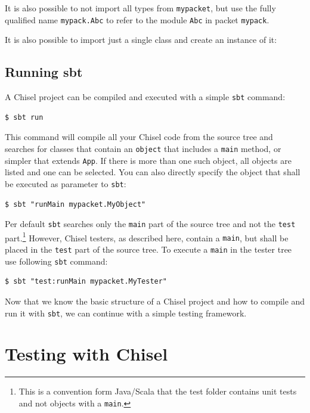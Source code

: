 \documentclass[%
    10pt,
    headinclude, footexclude,
    openright, %
    notitlepage,
    cleardoubleempty,
    headsepline,
    pointlessnumbers,
    bibtotoc, idxtotoc,
    ]{scrbook}
\newcommand{\code}[1]{{\small{\texttt{#1}}}}
\newcommand{\codefoot}[1]{{\footnotesize{\texttt{#1}}}}
\begin{document}
\noindent It is also possible to not import all types from \code{mypacket},
but use the fully qualified name \code{mypack.Abc} to refer to the module
\code{Abc} in packet \code{mypack}.


\noindent It is also possible to import just a single class and create an instance of it:



\subsection{Running sbt}

A Chisel project can be compiled and executed with a simple \code{sbt} command:

\begin{verbatim}
$ sbt run
\end{verbatim}

This command will compile all your Chisel code from the source tree and searches
for classes that contain an \code{object} that includes a \code{main} method, or simpler
that extends \code{App}. If there is more than one such object, all objects are listed and
one can be selected.
You can also directly specify the object that shall be executed as parameter to \code{sbt}:

\begin{verbatim}
$ sbt "runMain mypacket.MyObject"
\end{verbatim}

Per default \code{sbt} searches only the \code{main} part of the source tree and not
the \code{test} part.\footnote{This is a convention form Java/Scala that the test folder contains
unit tests and not objects with a \codefoot{main}.} However, Chisel testers, as described here,
contain a \code{main}, but shall be placed in the \code{test} part of the source tree.
To execute a \code{main} in the tester tree use following \code{sbt} command:

\begin{verbatim}
$ sbt "test:runMain mypacket.MyTester"
\end{verbatim}

Now that we know the basic structure of a Chisel project and how to compile and run it
with \code{sbt}, we can continue with a simple testing framework.
    
\section{Testing with Chisel}
\end{document}
